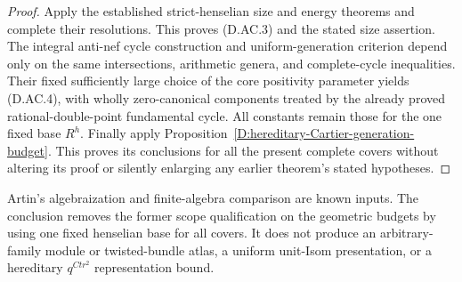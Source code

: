 \begin{proof}
Apply the established strict-henselian size and energy
theorems and complete their resolutions. This proves
(D.AC.3) and the stated size assertion. The integral
anti-nef cycle construction and uniform-generation
criterion depend only on the same intersections,
arithmetic genera, and complete-cycle inequalities.
Their fixed sufficiently large choice of the core
positivity parameter yields (D.AC.4), with wholly
zero-canonical components treated by the already
proved rational-double-point fundamental cycle.
All constants remain those for the one fixed base
$R^h$. Finally apply
Proposition~\ref{D:hereditary-Cartier-generation-budget}.
This proves its conclusions for all the present
complete covers without altering its proof or silently
enlarging any earlier theorem's stated hypotheses.
\end{proof}

\begin{remark}
Artin's algebraization and finite-algebra comparison are
known inputs. The conclusion removes the former scope
qualification on the geometric budgets by using one
fixed henselian base for all covers. It does not produce
an arbitrary-family module or twisted-bundle atlas, a
uniform unit-Isom presentation, or a hereditary
$q^{Ctr^2}$ representation bound.
\end{remark}
